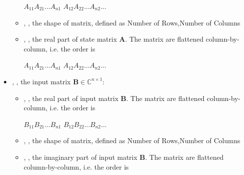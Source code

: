 \begin{itemize}
\begin{itemize}
    \begin{math} A_{11} A_{21} ... A_{n1} \end{math} \begin{math}A_{12} A_{22} ... A_{n2} ... \end{math}
    \item {}, , 
    the shape of matrix, defined as Number of Rows,Number of Columns
    \item {}, , 
    the real part of state matrix \begin{math} \textbf{A} \end{math}. The matrix are flattened 
    column-by-column, i.e. the order is 

    \begin{math} A_{11} A_{21} ... A_{n1} \end{math} \begin{math}A_{12} A_{22} ... A_{n2} ... \end{math}
  \end{itemize}
  
  \item {}, , 
  the input matrix \begin{math} \textbf{B}\in\mathbb{C}^{n \times 1} \end{math}:
  \begin{itemize}
    \item {}, , 
    the real part of input matrix \begin{math} \textbf{B} \end{math}. The matrix are flattened 
    column-by-column, i.e. the order is 

    \begin{math} B_{11} B_{21} ... B_{n1} \end{math} \begin{math}B_{12} B_{22} ... B_{n2} ... \end{math}
    \item {}, , 
    the shape of matrix, defined as Number of Rows,Number of Columns
    \item {}, , 
    the imaginary part of input matrix \begin{math} \textbf{B} \end{math}. The matrix are flattened 
    column-by-column, i.e. the order is 


\end{itemize}
\end{itemize}
